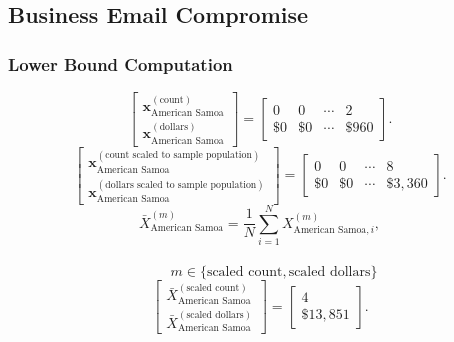 \subsection{Business Email Compromise}\label{sec:bec}
\subsubsection{Lower Bound Computation}
\[
\begin{bmatrix}
\mathbf{x}_{\text{American Samoa}}^{(\text{count})}\\
\mathbf{x}_{\text{American Samoa}}^{(\text{dollars})}
\end{bmatrix}
=
\begin{bmatrix}
0 & 0 & \cdots & 2\\
\$0 &\$0 & \cdots &\$960 
\end{bmatrix}.
\]
\[
\begin{bmatrix}
\mathbf{x}_{\text{American Samoa}}^{(\text{count scaled to sample population})}\\
\mathbf{x}_{\text{American Samoa}}^{(\text{dollars scaled to sample population})}
\end{bmatrix}
=
\begin{bmatrix}
0 & 0 & \cdots & 8\\
\$0 & \$0 & \cdots &\$3{,}360
\end{bmatrix}.
\]
  \[
\bar{X}_{\text{American Samoa}}^{(m)}
= \frac{1}{N}\sum_{i=1}^{N} X_{\text{American Samoa},i}^{(m)},
\]
\\
\[
\qquad
m \in \{\text{scaled count},\text{scaled dollars}\}
\]
\[
\begin{bmatrix}
\bar{X}_{\text{American Samoa}}^{(\text{scaled count})}\\
\bar{X}_{\text{American Samoa}}^{(\text{scaled dollars})}
\end{bmatrix}
=
\begin{bmatrix}
4\\
\$13{,}851
\end{bmatrix}.
\]
